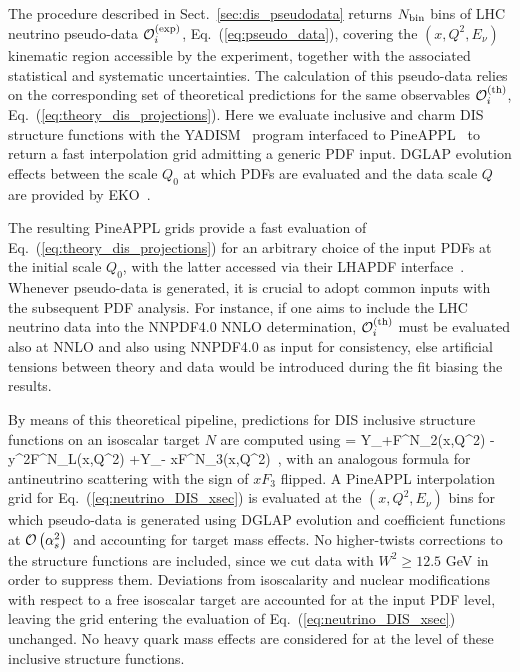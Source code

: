 The procedure described in Sect.~\ref{sec:dis_pseudodata} returns
$N_{\rm bin}$ bins of LHC neutrino pseudo-data $\mathcal{O}_i^{{\rm (exp)}}$, Eq.~(\ref{eq:pseudo_data}), covering the $(x,Q^2,E_\nu)$ kinematic region accessible by the experiment,
together with the associated statistical and systematic uncertainties.
%
The calculation of this pseudo-data relies on the corresponding set of
theoretical predictions for the same observables $\mathcal{O}_i^{{\rm (th)}}$,
Eq.~(\ref{eq:theory_dis_projections}).
%
Here we evaluate inclusive and charm DIS structure functions with the
{\sc\small YADISM}~\cite{yadism,Candido:2023utz} program
interfaced to {\sc\small PineAPPL}~\cite{Carrazza:2020gss, christopher_schwan_2023_7995675}
to return a fast interpolation grid admitting a generic PDF input.
%
DGLAP evolution effects between the scale $Q_0$ at which PDFs are evaluated
and the data scale $Q$ are provided by {\sc\small EKO}~\cite{Candido:2022tld}.

The resulting {\sc\small PineAPPL} grids provide a fast evaluation
of Eq.~(\ref{eq:theory_dis_projections}) for an arbitrary choice of the
input PDFs at the initial scale $Q_0$, with the latter accessed via their
{\sc\small LHAPDF} interface~\cite{Buckley:2014ana}.
%
Whenever pseudo-data is generated, it is crucial to adopt common inputs with
the subsequent PDF analysis.
%
For instance, if one aims to include the LHC neutrino data into the NNPDF4.0
NNLO determination, $\mathcal{O}_i^{{\rm (th)}}$ must be evaluated also at NNLO
and also using
NNPDF4.0 as input for consistency, else artificial tensions between theory
and data would be introduced during the fit biasing the results.

By means of this theoretical pipeline, predictions for
DIS inclusive structure functions on an isoscalar target $N$ are computed
using
\be
\label{eq:neutrino_DIS_xsec}
 =  \lc Y_+F^{\nu N}_2(x,Q^2) - y^2F^{\nu N}_L(x,Q^2) +Y_- xF^{\nu N}_3(x,Q^2)\rc  \, ,
\ee
with an analogous formula for antineutrino scattering with the sign of $xF_3$ flipped.
%
A {\sc\small PineAPPL} interpolation grid for
Eq.~(\ref{eq:neutrino_DIS_xsec}) is evaluated at the $(x,Q^2,E_\nu)$ bins
for which pseudo-data is generated using DGLAP evolution and coefficient
functions at $\mathcal{O}\left( \alpha_s^2\right)$ and accounting for target mass effects.
%
No higher-twists corrections to the structure functions are included, since we cut
data with $W^2 \ge 12.5$ GeV in order to suppress them.
%
Deviations from isoscalarity and nuclear modifications with respect
to a free isoscalar target are accounted for at the input PDF level,
leaving the grid entering the evaluation of Eq.~(\ref{eq:neutrino_DIS_xsec}) unchanged.
%
No heavy quark mass effects are considered for at the level of these inclusive structure functions.

